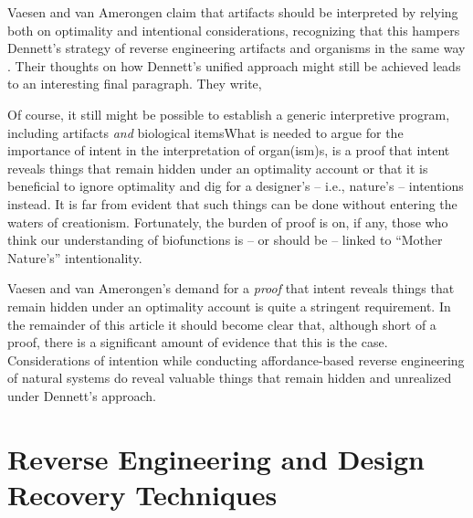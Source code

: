 Vaesen and van Amerongen claim that artifacts should be interpreted by
relying both on optimality and intentional considerations, recognizing
that this hampers Dennett’s strategy of reverse engineering artifacts
and organisms in the same way \citep[][pp. 794--795]{vaesenamerongen2008}. Their thoughts on
how Dennett’s unified approach might still be achieved leads to an
interesting final paragraph. They write,

\begin{quoting}
Of course, it still might be
possible to establish a generic interpretive program, including
artifacts \textit{and} biological items{\jdots}What is needed to argue for
the importance of intent in the interpretation of organ(ism)s, is a
proof that intent reveals things that remain hidden under an optimality
account or that it is beneficial to ignore optimality and dig for a
designer’s – i.e., nature’s – intentions instead. It is far from
evident that such things can be done without entering the waters of
creationism. Fortunately, the burden of proof is on, if any, those who
think our understanding of biofunctions is – or should be – linked to
“Mother Nature’s” intentionality.  \citep[][p.~795]{vaesenamerongen2008}
\end{quoting}

Vaesen and van
Amerongen’s demand for a \textit{proof} that intent reveals things that
remain hidden under an optimality account is quite a stringent
requirement. In the remainder of this article it should become clear
that, although short of a proof, there is a significant amount of
evidence that this is the case. Considerations of intention while
conducting affordance-based reverse engineering of natural systems do
reveal valuable things that remain hidden and unrealized under
Dennett’s approach.

\section{Reverse Engineering and Design Recovery Techniques}

